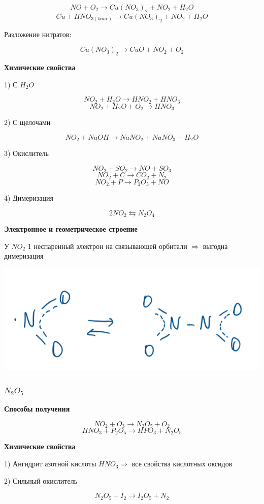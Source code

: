 $$NO + O_2 \rightarrow Cu(NO_3)_2 + NO_2 + H_2O$$
$$Cu + HNO_{3(konc)} \rightarrow Cu(NO_3)_2 + NO_2 + H_2O$$

Разложение нитратов:

$$Cu(NO_3)_2 \rightarrow CuO + NO_2 + O_2$$

\textbf{Химические свойства}

1) С $H_2O$

$$NO_2 + H_2O \rightarrow HNO_2 + HNO_3$$
$$NO_2 + H_2O + O_2 \rightarrow HNO_3$$

2) С щелочами

$$NO_2 + NaOH \rightarrow NaNO_2 + NaNO_3 + H_2O$$

3) Окислитель

$$NO_2 + SO_2 \rightarrow NO + SO_3$$
$$NO_2 + C \rightarrow CO_2 + N_2$$
$$NO_2 + P \rightarrow P_2O_5 + NO$$

4) Димеризация

$$2NO_2 \leftrightarrows N_2O_4$$

\textbf{Электронное и геометрическое строение}

У $NO_2$ 1 неспаренный электрон на связывающей орбитали $\Rightarrow$ выгодна димеризация

\includegraphics{images/8v10.png}

\subsubsection*{$N_2O_5$}

\textbf{Способы получения}

$$NO_2 +O_3 \rightarrow N_2O_5 + O_2$$
$$HNO_3  + P_2O_5 \rightarrow HPO_3 + N_2O_5$$

\textbf{Химические свойства}

1) Ангидрит азотной кислоты $HNO_3 \Rightarrow$ все свойства кислотных оксидов

2) Сильный окислитель

$$N_2O_5 + I_2 \rightarrow I_2O_5 + N_2$$

